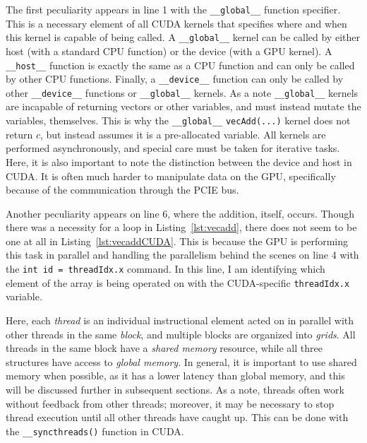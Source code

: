The first peculiarity appears in line 1 with the \texttt{\_\_global\_\_} function specifier.
This is a necessary element of all CUDA kernels that specifies where and when this kernel is capable of being called.
A \texttt{\_\_global\_\_} kernel can be called by either host (with a standard CPU function) or the device (with a GPU kernel).
A \texttt{\_\_host\_\_} function is exactly the same as a CPU function and can only be called by other CPU functions.
Finally, a \texttt{\_\_device\_\_} function can only be called by other \texttt{\_\_device\_\_} functions or \texttt{\_\_global\_\_} kernels.
As a note \texttt{\_\_global\_\_} kernels are incapable of returning vectors or other variables, and must instead mutate the variables, themselves.
This is why the \texttt{\_\_global\_\_} \texttt{vecAdd(...)} kernel does not return $c$, but instead assumes it is a pre-allocated variable.
All kernels are performed asynchronously, and special care must be taken for iterative tasks.
Here, it is also important to note the distinction between the device and host in CUDA.
It is often much harder to manipulate data on the GPU, specifically because of the communication through the PCIE bus.

Another peculiarity appears on line 6, where the addition, itself, occurs.
Though there was a necessity for a loop in Listing~\ref{lst:vecadd}, there does not seem to be one at all in Listing~\ref{lst:vecaddCUDA}.
This is because the GPU is performing this task in parallel and handling the parallelism behind the scenes on line 4 with the \texttt{int id = threadIdx.x} command.
In this line, I am identifying which element of the array is being operated on with the CUDA-specific \texttt{threadIdx.x} variable.

Here, each \textit{thread} is an individual instructional element acted on in parallel with other threads in the same \textit{block}, and multiple blocks are organized into \textit{grids}.
All threads in the same block have a \textit{shared memory} resource, while all three structures have access to \textit{global memory}.
In general, it is important to use shared memory when possible, as it has a lower latency than global memory, and this will be discussed further in subsequent sections.
As a note, threads often work without feedback from other threads; moreover, it may be necessary to stop thread execution until all other threads have caught up.
This can be done with the \texttt{\_\_syncthreads()} function in CUDA.

